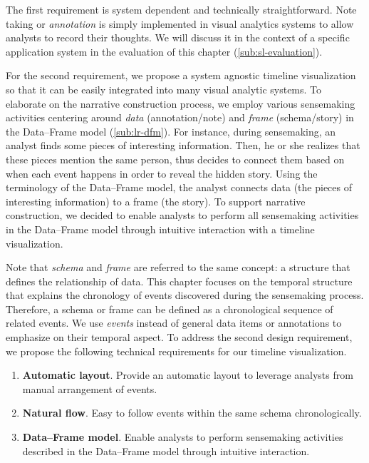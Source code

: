 The first requirement is system dependent and technically straightforward. Note taking or \emph{annotation} is simply implemented in visual analytics systems to allow analysts to record their thoughts. We will discuss it in the context of a specific application system in the evaluation of this chapter (\autoref{sub:sl-evaluation}).

For the second requirement, we propose a system agnostic timeline visualization so that it can be easily integrated into many visual analytic systems. To elaborate on the narrative construction process, we employ various sensemaking activities centering around \emph{data} (annotation/note) and \emph{frame} (schema/story) in the Data--Frame model (\autoref{sub:lr-dfm}). For instance, during sensemaking, an analyst finds some pieces of interesting information. Then, he or she realizes that these pieces mention the same person, thus decides to connect them based on when each event happens in order to reveal the hidden story. Using the terminology of the Data--Frame model, the analyst connects data (the pieces of interesting information) to a frame (the story). To support narrative construction, we decided to enable analysts to perform all sensemaking activities in the Data--Frame model through intuitive interaction with a timeline visualization. 

Note that \emph{schema} and \emph{frame} are referred to the same concept: a structure that defines the relationship of data. This chapter focuses on the temporal structure that explains the chronology of events discovered during the sensemaking process. Therefore, a schema or frame can be defined as a chronological sequence of related events. We use \emph{events} instead of general data items or annotations to emphasize on their temporal aspect. To address the second design requirement, we propose the following technical requirements for our timeline visualization.

\begin{enumerate}
	\item \textbf{Automatic layout}. Provide an automatic layout to leverage analysts from manual arrangement of events.
	\item \textbf{Natural flow}. Easy to follow events within the same schema chronologically.
	\item \textbf{Data--Frame model}. Enable analysts to perform sensemaking activities described in the Data--Frame model through intuitive interaction.
\end{enumerate}